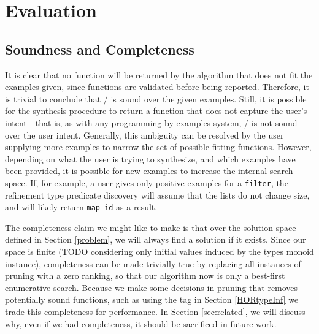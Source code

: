 \section{Evaluation}\label{evaluation}

\subsection{Soundness and Completeness}\label{sound}

It is clear that no function will be returned by the algorithm that does not fit the examples given, since functions are validated before being reported.
Therefore, it is trivial to conclude that \ourTool/ is sound over the given examples.
Still, it is possible for the synthesis procedure to return a function that does not capture the user's intent - that is, as with any programming by examples system, \ourTool/ is not sound over the user intent.
Generally, this ambiguity can be resolved by the user supplying more examples to narrow the set of possible fitting functions.
However, depending on what the user is trying to synthesize, and which examples have been provided, it is possible for new examples to increase the internal search space.
If, for example, a user gives only positive examples for a \texttt{filter}, the refinement type predicate discovery will assume that the lists do not change size, and will likely return \texttt{map id} as a result.

The completeness claim we might like to make is that over the solution space defined in Section \ref{problem}, we will always find a solution if it exists.
Since our space is finite (TODO considering only initial values induced by the types monoid instance), completeness can be made trivially true by replacing all instances of pruning with a zero ranking, so that our algorithm now is only a best-first enumerative search.
Because we make some decisions in pruning that removes potentially sound functions, such as using the  tag in Section \ref{HORtypeInf} we trade this completeness for performance.
In Section \ref{sec:related}, we will discuss why, even if we had completeness, it should be sacrificed in future work.


